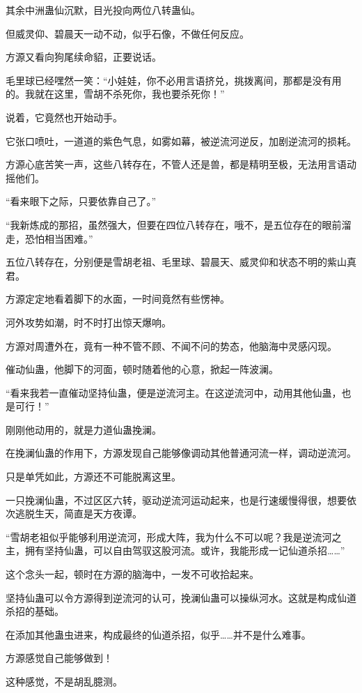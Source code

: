 \begin{this_body}
其余中洲蛊仙沉默，目光投向两位八转蛊仙。

但威灵仰、碧晨天一动不动，似乎石像，不做任何反应。

方源又看向狗尾续命貂，正要说话。

毛里球已经嘿然一笑：“小娃娃，你不必用言语挤兑，挑拨离间，那都是没有用的。我就在这里，雪胡不杀死你，我也要杀死你！”

说着，它竟然也开始动手。

它张口喷吐，一道道的紫色气息，如雾如幕，被逆流河逆反，加剧逆流河的损耗。

方源心底苦笑一声，这些八转存在，不管人还是兽，都是精明至极，无法用言语动摇他们。

“看来眼下之际，只要依靠自己了。”

“我新炼成的那招，虽然强大，但要在四位八转存在，哦不，是五位存在的眼前溜走，恐怕相当困难。”

五位八转存在，分别便是雪胡老祖、毛里球、碧晨天、威灵仰和状态不明的紫山真君。

方源定定地看着脚下的水面，一时间竟然有些愣神。

河外攻势如潮，时不时打出惊天爆响。

方源对周遭外在，竟有一种不管不顾、不闻不问的势态，他脑海中灵感闪现。

催动仙蛊，他脚下的河面，顿时随着他的心意，掀起一阵波澜。

“看来我若一直催动坚持仙蛊，便是逆流河主。在这逆流河中，动用其他仙蛊，也是可行！”

刚刚他动用的，就是力道仙蛊挽澜。

在挽澜仙蛊的作用下，方源发现自己能够像调动其他普通河流一样，调动逆流河。

只是单凭如此，方源还不可能脱离这里。

一只挽澜仙蛊，不过区区六转，驱动逆流河运动起来，也是行速缓慢得很，想要依次逃脱生天，简直是天方夜谭。

“雪胡老祖似乎能够利用逆流河，形成大阵，我为什么不可以呢？我是逆流河之主，拥有坚持仙蛊，可以自由驾驭这股河流。或许，我能形成一记仙道杀招……”

这个念头一起，顿时在方源的脑海中，一发不可收拾起来。

坚持仙蛊可以令方源得到逆流河的认可，挽澜仙蛊可以操纵河水。这就是构成仙道杀招的基础。

在添加其他蛊虫进来，构成最终的仙道杀招，似乎……并不是什么难事。

方源感觉自己能够做到！

这种感觉，不是胡乱臆测。


\end{this_body}
